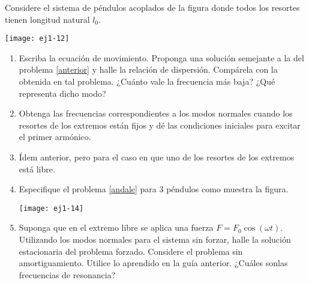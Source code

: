 \item
\begin{minipage}[t][2cm]{0.6\textwidth}
 Considere el sistema de péndulos acoplados de la figura donde todos los resortes tienen longitud natural $l_0$. 
\end{minipage}
\begin{minipage}[c][2cm][t]{0.35\textwidth}
  \texttt{[image: ej1-12]}
\end{minipage}
\begin{enumerate}
	\item Escriba la ecuación de movimiento.
	Proponga una solución semejante a la del problema \ref{anterior} y halle la relación de dispersión.
	Compárela con la obtenida en tal problema.
	¿Cuánto vale la frecuencia más baja?
	¿Qué representa dicho modo? 
	\item Obtenga las frecuencias correspondientes a los modos normales cuando los resortes de los extremos están fijos y dé las condiciones iniciales para excitar el primer armónico. 
	\item \label{andale} Ídem anterior, pero para el caso en que uno de los resortes de los extremos está libre.
	\item 
	\begin{minipage}[t][1.6cm]{0.7\textwidth}
	Especifique el problema \ref{andale} para 3 péndulos como muestra la figura.
	\end{minipage}
	\begin{minipage}[c][2cm][t]{0.2\textwidth}
  	\texttt{[image: ej1-14]}
	\end{minipage}
	\item Suponga que en el extremo libre se aplica una fuerza \(F = F_0 \cos(\omega t)\).
	Utilizando los modos normales para el sistema sin forzar, halle la solución estacionaria del problema forzado. Considere el problema sin amortiguamiento. Utilice lo aprendido en la guía anterior.
	¿Cuáles sonlas frecuencias de resonancia?
\end{enumerate}
